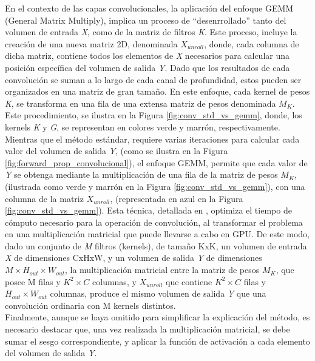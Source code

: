 En el contexto de las capas convolucionales, la aplicación del enfoque GEMM (General Matrix Multiply), implica un proceso de ``desenrrollado'' tanto del volumen de entrada \textit{X}, como de la matriz de filtros \textit{K}. Este proceso, incluye la creación de una nueva matriz 2D, denominada $X_{unroll}$, donde, cada columna de dicha matriz, contiene todos los elementos de \textit{X} necesarios para calcular una posición específica del volumen de salida \textit{Y}. Dado que los resultados de cada convolución se suman a lo largo de cada canal de profundidad, estos pueden ser organizados en una matriz de gran tamaño. En este enfoque, cada kernel de pesos \textit{K}, se transforma en una fila de una extensa matriz de pesos denominada $M_{K}$. Este procedimiento, se ilustra en la Figura \ref{fig:conv_std_vs_gemm}, donde, los kernels \textit{K} y \textit{G}, se representan en colores verde y marrón, respectivamente. \\
Mientras que el método estándar, requiere varias iteraciones para calcular cada valor del volumen de salida \textit{Y}, (como se ilustra en la Figura \ref{fig:forward_prop_convolucional}), el enfoque GEMM, permite que cada valor de \textit{Y} se obtenga mediante la multiplicación de una fila de la matriz de pesos $M_{K}$, (ilustrada como verde y marrón en la Figura \ref{fig:conv_std_vs_gemm}), con una columna de la matriz $X_{unroll}$, (representada en azul en la Figura \ref{fig:conv_std_vs_gemm}). Esta técnica, detallada en \cite{Programming_Massively}, optimiza el tiempo de cómputo necesario para la operación de convolución, al transformar el problema en una multiplicación matricial que puede llevarse a cabo en GPU.
De este modo, dado un conjunto de \textit{M} filtros (kernels), de tamaño KxK, un volumen de entrada \textit{X} de dimensiones CxHxW, y un volumen de salida \textit{Y} de dimensiones $M \times H_{out} \times W_{out}$, la multiplicación matricial entre la matriz de pesos $M_{K}$, que posee M filas y $K^2 \times C$ columnas, y $X_{unroll}$ que contiene $K^2 \times C$ filas y $H_{out} \times W_{out}$ columnas, produce el mismo volumen de salida \textit{Y} que una convolución ordinaria con M kernels distintos. \\
Finalmente, aunque se haya omitido para simplificar la explicación del método, es necesario destacar que, una vez realizada la multiplicación matricial, se debe sumar el sesgo correspondiente, y aplicar la función de activación a cada elemento del volumen de salida \textit{Y}.

